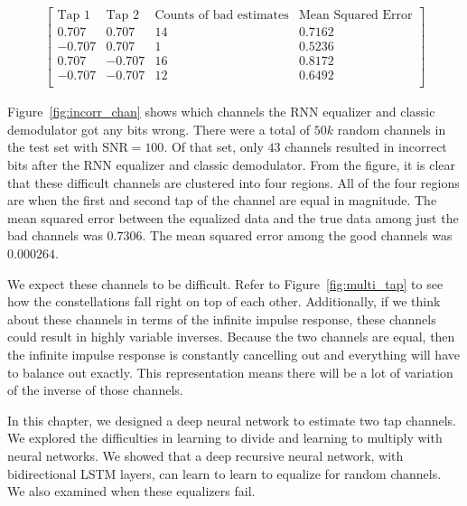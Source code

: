 \begin{align*}
\begin{bmatrix}
\text{Tap 1} & \text{Tap 2} & \text{Counts of bad estimates} & \text{Mean Squared Error}\\
\hline
0.707 & 0.707 & 14 & 0.7162\\
-0.707 & 0.707 & 1 & 0.5236\\
0.707 & -0.707 & 16 & 0.8172\\
-0.707 & -0.707 & 12 & 0.6492\\
\end{bmatrix}
\end{align*}

Figure~\ref{fig:incorr_chan} shows which channels the RNN equalizer and classic demodulator got any bits wrong.  
There were a total of $50k$ random channels in the test set with SNR$=100$.
Of that set, only $43$ channels resulted in incorrect bits after the RNN equalizer and classic demodulator.
From the figure, it is clear that these difficult channels are clustered into four regions. All of the four regions are when the first and second tap of the channel are equal in magnitude.
The mean squared error between the equalized data and the true data among just the bad channels was $0.7306$.  The mean squared error among the good channels was $0.000264$.

We expect these channels to be difficult.  Refer to Figure~\ref{fig:multi_tap} to see how the constellations fall right on top of each other.
Additionally, if we think about these channels in terms of the infinite impulse response, these channels could result in highly variable inverses.  Because the two channels are equal, then the infinite impulse response is constantly cancelling out and everything will have to balance out exactly.  This representation means there will be a lot of variation of the inverse of those channels.

In this chapter, we designed a deep neural network to estimate two tap channels.
We explored the difficulties in learning to divide and learning to multiply with neural networks. We showed that a deep recursive neural network, with bidirectional LSTM layers, can learn to learn to equalize for random channels.  We also examined when these equalizers fail. 